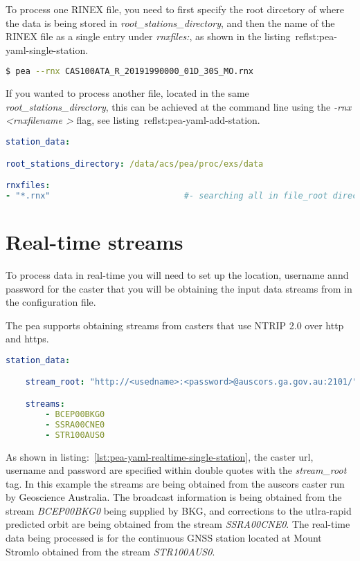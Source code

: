 %
To process one RINEX file, you need to first specify the root dircetory of where the data is being stored in \emph{root\_stations\_directory}, and then the name of the RINEX file as a single entry under \emph{rnxfiles:}, as shown in the listing~ref{lst:pea-yaml-single-station}. 
%
\begin{lstlisting}[language=bash,caption=Example showing how to add a RINEX file to the processing list form the command line]
$ pea --rnx CAS100ATA_R_20191990000_01D_30S_MO.rnx
\end{lstlisting}
%
If you wanted to process another file, located in the same \emph{root\_stations\_directory}, this can be achieved at the command line using the \emph{-rnx \textless rnxfilename \textgreater} flag, see listing~ref{lst:pea-yaml-add-station}.
%
\begin{lstlisting}[language=yaml,caption=yaml input files configuration example]
station_data:

root_stations_directory: /data/acs/pea/proc/exs/data

rnxfiles:
- "*.rnx"                           #- searching all in file_root directory
\end{lstlisting}

\section{Real-time streams}
To process data in real-time you will need to set up the location, username annd password for the caster that you will be obtaining the input data streams from in the configuration file.

The pea supports obtaining streams from casters that use NTRIP 2.0 over http and https.


\begin{lstlisting}[language=yaml,caption=yaml input files configuration example]
station_data:

	stream_root: "http://<usedname>:<password>@auscors.ga.gov.au:2101/"

	streams:
		- BCEP00BKG0
		- SSRA00CNE0
		- STR100AUS0
\end{lstlisting}
%
As shown in listing:~\ref{lst:pea-yaml-realtime-single-station}, the caster url, username and password are specified within double quotes with the \emph{stream\_root} tag. In this example the streams are being obtained from the auscors caster run by Geoscience Australia. 
The broadcast information is being obtained from the stream \emph{BCEP00BKG0} being supplied by BKG, and corrections to the utlra-rapid predicted orbit are being obtained from the stream \emph{SSRA00CNE0}. 
The real-time data being processed is for the continuous GNSS station located at Mount Stromlo obtained from the stream \emph{STR100AUS0}.

